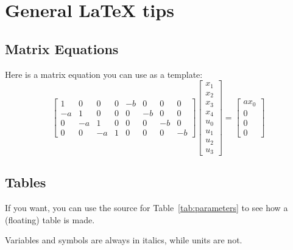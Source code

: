 \section{General LaTeX tips}\label{sec:latex_tips}

\subsection{Matrix Equations}
Here is a matrix equation you can use as a template:
\begin{equation}
	\begin{bmatrix}
		1 &  0 &  0 & 0 & -b &  0 &  0 &  0 \\
		-a &  1 &  0 & 0 &  0 & -b &  0 &  0 \\
		0 & -a &  1 & 0 &  0 &  0 & -b &  0 \\
		0 &  0 & -a & 1 &  0 &  0 &  0 & -b                                
	\end{bmatrix}
	\begin{bmatrix} x_1 \\ x_2 \\ x_3 \\ x_4 \\ u_0 \\ u_1 \\ u_2 \\ u_3 \end{bmatrix}
	=
	\begin{bmatrix}
		ax_0 \\ 0 \\ 0 \\ 0      
	\end{bmatrix}
\end{equation}

\subsection{Tables}
If you want, you can use the source for Table~\ref{tab:parameters} to see how a (floating) table is made. 

Variables and symbols are always in italics, while units are not.

